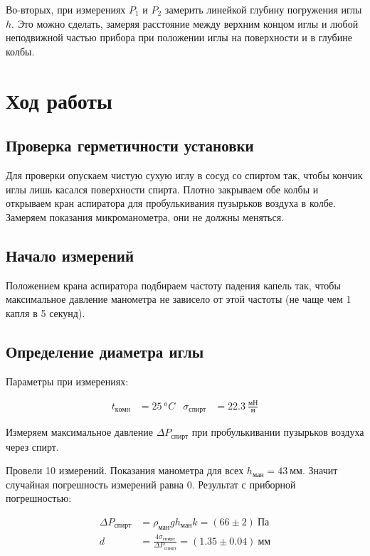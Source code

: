 \documentclass[a4paper, 12pt]{article}
\begin{document}
	Во-вторых, при измерениях $ P_1 $ и $ P_2 $ замерить линейкой  глубину погружения иглы $ h $. Это можно сделать, замеряя расстояние между верхним концом иглы и любой неподвижной частью прибора при положении иглы на поверхности и в глубине колбы.

	\section{Ход работы}

		\subsection{Проверка герметичности установки}

			Для проверки опускаем чистую сухую иглу в сосуд со спиртом так, чтобы кончик иглы лишь касался поверхности спирта. Плотно закрываем обе колбы и открываем кран аспиратора для пробулькивания пузырьков воздуха в колбе. Замеряем показания микроманометра, они не должны меняться.

		\subsection{Начало измерений}

			Положением крана аспиратора подбираем частоту падения капель так, чтобы максимальное давление манометра не зависело от этой частоты (не чаще чем 1 капля в 5 секунд).

		\subsection{Определение диаметра иглы}
			\label{needle_diam}

			Параметры при измерениях:

			\begin{align*}
				t_{комн} &= 25~^oC & \sigma_{спирт} &= 22.3~\frac{мН}{м}
			\end{align*}

			Измеряем максимальное давление $\Delta P_{спирт}$ при пробулькивании пузырьков воздуха через спирт.

			Провели 10 измерений. Показания манометра для всех $h_{ман} = 43~мм$. Значит случайная погрешность измерений равна 0. Результат с приборной погрешностью:

			\begin{align*}
				\Delta P_{спирт} &= \rho_{ман} g h_{ман} k = (66 \pm 2)~Па \\
				d &= \frac{4 \sigma_{спирт}}{\Delta P_{спирт}} = (1.35 \pm 0.04)~мм
			\end{align*}
\end{document}
